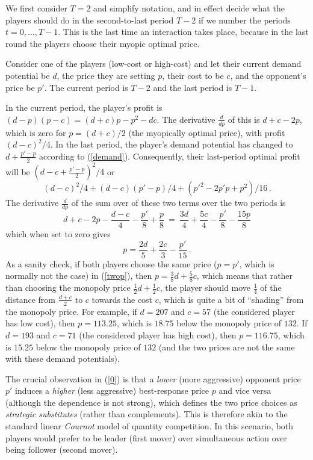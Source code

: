\documentclass[a4paper,12pt]{article}  %
\theoremstyle{definition}
\begin{document}
We first consider $T=2$ and simplify notation, and in effect
decide what the players should do in the second-to-last
period $T-2$ if we number the periods $t=0,\ldots,T-1$.
This is the last time an interaction takes place, because in
the last round the players choose their myopic optimal
price.

Consider one of the players (low-cost or high-cost) and let
their current demand potential be $d$, the price they are
setting $p$, their cost to be $c$, and the opponent's price
be $p'$.
The current period is $T-2$ and the last period is $T-1$.

In the current period, the player's profit is
$(d-p)(p-c)=(d+c)p-p^2-dc$.
The derivative $\frac d{dp}$ of this is $d+c-2p$, which is
zero for $p=(d+c)/2$ (the myopically optimal price), with
profit $(d-c)^2/4$.
In the last period, the player's demand potential has
changed to $d+\frac{p'-p}2$ according to (\ref{demand}).
Consequently, their last-period optimal profit will be
$(d-c+\frac{p'-p}2)^2/4$ or
\[
(d-c)^2/4+(d-c){(p'-p)}/4+(p'^2-2p'p+p^2)/16\,.
\]
The derivative $\frac d{dp}$ of the sum over of these two
terms over the two periods is
\begin{equation}
\label{twop}
d+c-2p-\frac{d-c}4-\frac{p'}8+\frac{p}8
~=~ 
\frac{3d}4+ \frac{5c}4-\frac{p'}8-\frac{15p}8
\end{equation}
which when set to zero gives
\begin{equation}
\label{0}
p=\frac{2d}5+\frac{2c}3-\frac{p'}{15}\,.
\end{equation}
As a sanity check, if both players choose the same price
($p=p'$, which is normally not the case) in (\ref{twop}),
then $p=\frac38d+\frac58c$, which means that rather than
choosing the monopoly price $\frac12d+\frac12c$, the player
should move $\frac14$ of the distance from $\frac{d+c}2$ to
$c$ towards the cost $c$, which is quite a bit of
``shading'' from the monopoly price.
For example, if $d=207$ and $c=57$ (the considered player
has low cost), then $p=113.25$, which is $18.75$ below the
monopoly price of $132$.
If $d=193$ and $c=71$ (the considered player
has high cost), then $p=116.75$, which is $15.25$ below the
monopoly price of $132$ (and the two prices are not the same
with these demand potentials).

The crucial observation in (\ref{0}) is that a
\textit{lower} (more aggressive) opponent price $p'$
induces a \textit{higher} (less aggressive) best-response
price $p$ and vice versa (although the dependence is not
strong), which defines the two price choices as
\textit{strategic substitutes} (rather than complements).
This is therefore akin to the standard linear
\textit{Cournot} model of quantity competition.
In this scenario, both players would prefer to be
leader (first mover) over simultaneous action over being
follower (second mover).
\end{document}
